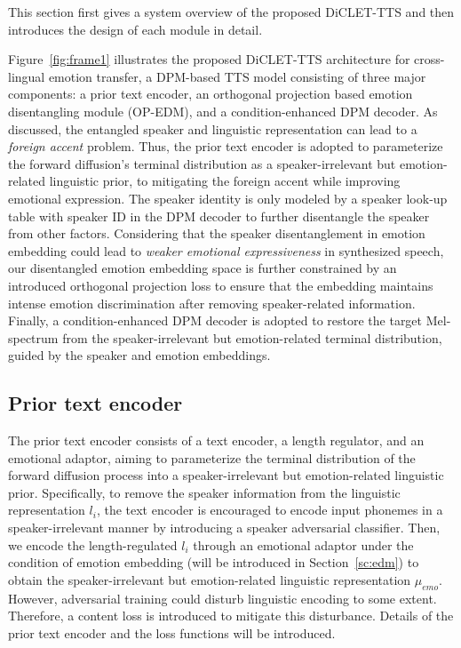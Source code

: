 \documentclass[journal,comsoc]{IEEEtran}
\begin{document}
This section first gives a system overview of the proposed DiCLET-TTS and then introduces the design of each module in detail.

Figure~\ref{fig:frame1} illustrates the proposed DiCLET-TTS architecture for cross-lingual emotion transfer, a DPM-based TTS model consisting of three major components: a prior text encoder, an orthogonal projection based emotion disentangling module (OP-EDM), and a condition-enhanced DPM decoder. 
As discussed, the entangled speaker and linguistic representation can lead to a \textit{foreign accent} problem.
Thus, the prior text encoder is adopted to parameterize the forward diffusion's terminal distribution as a speaker-irrelevant but emotion-related linguistic prior, to mitigating the foreign accent while improving emotional expression.
The speaker identity is only modeled by a speaker look-up table with speaker ID in the DPM decoder to further disentangle the speaker from other factors.
Considering that the speaker disentanglement in emotion embedding could lead to \textit{weaker emotional expressiveness} in synthesized speech, our disentangled emotion embedding space is further constrained by an introduced orthogonal projection loss to ensure that the embedding maintains intense emotion discrimination after removing speaker-related information.
Finally, a condition-enhanced DPM decoder is adopted to restore the target Mel-spectrum from the speaker-irrelevant but emotion-related terminal distribution, guided by the speaker and emotion embeddings.

\vspace{-0.3cm}
\subsection{Prior text encoder}
\label{sc:text_encoder}

The prior text encoder consists of a text encoder, a length regulator, and an emotional adaptor, aiming to parameterize the terminal distribution of the forward diffusion process into a speaker-irrelevant but emotion-related linguistic prior. 
Specifically, to remove the speaker information from the linguistic representation $l_i$, the text encoder is encouraged to encode input phonemes in a speaker-irrelevant manner by introducing a speaker adversarial classifier.
Then, we encode the length-regulated $l_i$ through an emotional adaptor under the condition of emotion embedding (will be introduced in Section~\ref{sc:edm}) to obtain the speaker-irrelevant but emotion-related linguistic representation $\mu_{emo}$.
However, adversarial training could disturb linguistic encoding to some extent. 
Therefore, a content loss is introduced to mitigate this disturbance.
Details of the prior text encoder and the loss functions will be introduced.
\end{document}
